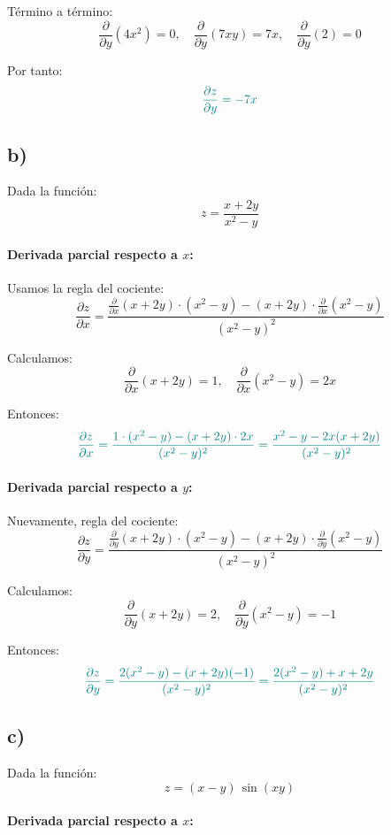 \documentclass{article}
\begin{document}
Término a término:
\[
\frac{\partial}{\partial y}(4x^2) = 0,
\quad
\frac{\partial}{\partial y}(7xy) = 7x,
\quad
\frac{\partial}{\partial y}(2) = 0
\]

Por tanto:
\[
\color{teal}
\frac{\partial z}{\partial y}
= -7x
\]

\subsection*{b)}
Dada la función:
\[
z = \frac{x + 2y}{x^2 - y}
\]

\paragraph{Derivada parcial respecto a \(x\):}
Usamos la regla del cociente:
\[
\frac{\partial z}{\partial x}
= \frac{
  \frac{\partial}{\partial x}(x + 2y) \cdot (x^2 - y)
  - (x + 2y) \cdot \frac{\partial}{\partial x}(x^2 - y)
}{
(x^2 - y)^2
}
\]

Calculamos:
\[
\frac{\partial}{\partial x}(x + 2y) = 1,
\quad
\frac{\partial}{\partial x}(x^2 - y) = 2x
\]

Entonces:
\[
\color{teal}
\frac{\partial z}{\partial x}
= \frac{
  1 \cdot (x^2 - y) - (x + 2y) \cdot 2x
}{
(x^2 - y)^2
}
= \frac{x^2 - y - 2x(x + 2y)}{(x^2 - y)^2}
\]

\paragraph{Derivada parcial respecto a \(y\):}
Nuevamente, regla del cociente:
\[
\frac{\partial z}{\partial y}
= \frac{
  \frac{\partial}{\partial y}(x + 2y) \cdot (x^2 - y)
  - (x + 2y) \cdot \frac{\partial}{\partial y}(x^2 - y)
}{
(x^2 - y)^2
}
\]

Calculamos:
\[
\frac{\partial}{\partial y}(x + 2y) = 2,
\quad
\frac{\partial}{\partial y}(x^2 - y) = -1
\]

Entonces:
\[
\color{teal}
\frac{\partial z}{\partial y}
= \frac{
  2(x^2 - y) - (x + 2y)(-1)
}{
(x^2 - y)^2
}
= \frac{2(x^2 - y) + x + 2y}{(x^2 - y)^2}
\]



\subsection*{c)}
Dada la función:
\[
z = (x - y)\,\sin(xy)
\]

\paragraph{Derivada parcial respecto a \(x\):}
\end{document}
